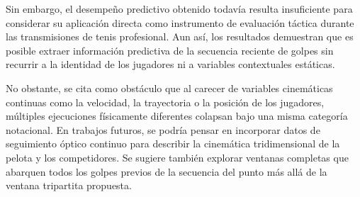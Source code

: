\documentclass[journal]{IEEEtran}
\begin{document}
Sin embargo, el desempeño predictivo obtenido todavía resulta insuficiente para considerar su aplicación directa como instrumento de evaluación táctica durante las transmisiones de tenis profesional. Aun así, los resultados demuestran que es posible extraer información predictiva de la secuencia reciente de golpes sin recurrir a la identidad de los jugadores ni a variables contextuales estáticas.

No obstante, se cita como obstáculo que al carecer de variables cinemáticas continuas como la velocidad, la trayectoria o la posición de los jugadores, múltiples ejecuciones físicamente diferentes colapsan bajo una misma categoría notacional. En trabajos futuros, se podría pensar en incorporar datos de seguimiento óptico continuo para describir la cinemática tridimensional de la pelota y los competidores. Se sugiere también explorar ventanas completas que abarquen todos los golpes previos de la secuencia del punto más allá de la ventana tripartita propuesta.



\end{document}
